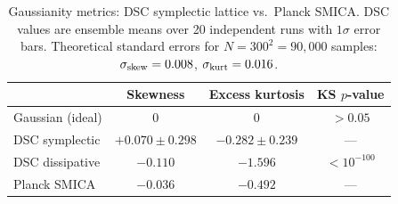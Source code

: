 \begin{table}[htbp]
\centering
\caption{Gaussianity metrics: DSC symplectic lattice vs.\ Planck SMICA.
  DSC values are ensemble means over 20 independent runs with $1\sigma$ error bars.
  Theoretical standard errors for $N=300^2=90{,}000$ samples: $\sigma_{\rm skew}=0.008$, $\sigma_{\rm kurt}=0.016$.}
\label{tab:gaussianity}
\begin{tabular}{lccc}
\toprule
 & Skewness & Excess kurtosis & KS $p$-value \\
\midrule
Gaussian (ideal) & $0$ & $0$ & $>0.05$ \\
DSC symplectic & $+0.070 \pm 0.298$ & $-0.282 \pm 0.239$ & --- \\
DSC dissipative & $-0.110$ & $-1.596$ & $<10^{-100}$ \\
Planck SMICA & $-0.036$ & $-0.492$ & --- \\
\bottomrule
\end{tabular}
\end{table}
